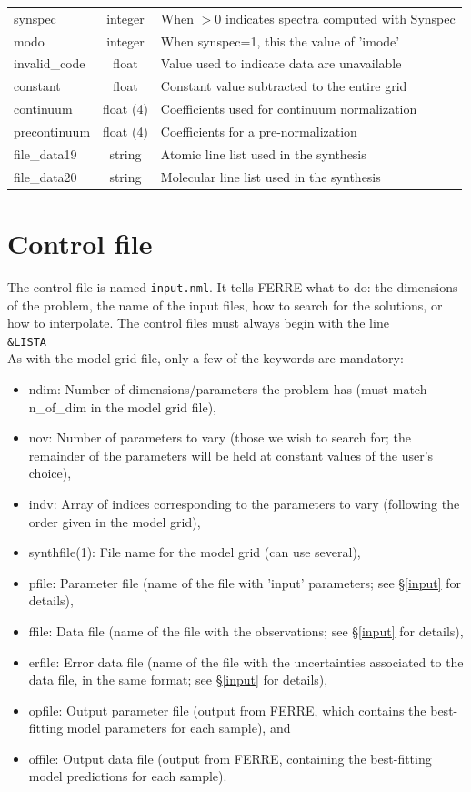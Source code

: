\documentclass[12pt]{article}
\begin{document}
\begin{table}
\begin{tabular}{lcl}
synspec    &  integer      & When $>0$ indicates spectra computed with Synspec \\
modo    & integer          & When synspec=1, this the value of 'imode' \\
invalid\_code    &  float  & Value used to indicate data are unavailable \\
constant    & float  &   Constant value subtracted to the entire grid \\
continuum    & float (4)  & Coefficients used for continuum normalization \\
precontinuum    &  float (4) & Coefficients for a pre-normalization \\
file\_data19    & string & Atomic line list used in the synthesis \\
file\_data20    & string & Molecular line list used in the synthesis \\
\hline
\end{tabular} 
\end{table}

\section{Control file}
\label{nml}

The control file is named {\tt input.nml}. It tells FERRE what to do:
the dimensions of the problem, the name of the input files,
how to search for the solutions, or how to interpolate. The control files
must always begin with the line \\
{\tt \&LISTA}\\
As with the model grid file, only a few of the keywords are mandatory:
\begin{itemize}
\item ndim: Number of dimensions/parameters the problem has 
  (must match n\_of\_dim in the model grid file), 
\item nov: Number of parameters to vary (those we wish to search for; 
  the remainder of the parameters will be held at constant values of the user's choice), 
\item indv: Array of indices corresponding to the parameters to vary 
  (following the order given in the model grid), 
\item synthfile(1): File name for the model grid (can use several), 
\item pfile: Parameter file (name of the file with 'input' parameters; 
  see \S \ref{input} for details), 
\item ffile: Data file (name of the file with the observations; 
  see \S \ref{input} for details), 
\item erfile: Error data file (name of the file with the uncertainties 
  associated to the data file, in the same format; see \S \ref{input} for details), 
\item opfile: Output parameter file (output from FERRE, which contains the
best-fitting model parameters for each sample), and 
\item offile: Output data file (output from FERRE, containing the best-fitting 
  model predictions for each sample).
\end{itemize}
\end{document}
